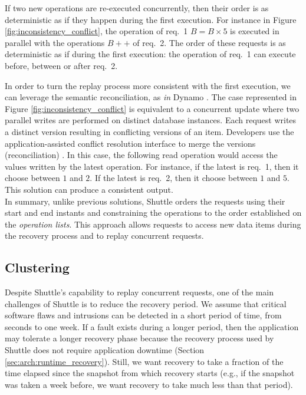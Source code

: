 If two new operations are re-executed concurrently, then their order is as deterministic as if they happen during the first execution. For instance in Figure \ref{fig:inconsistency_conflict}, the operation of {req.~1} $B = B \times 5$ is executed in parallel with the operations $B++$ of {req.~2}. The order of these requests is as deterministic as if during the first execution: the operation of {req.~1} can execute before, between or after {req.~2}.


In order to turn the replay process more consistent with the first execution, we can leverage the semantic reconciliation, as \textit{in} Dynamo \cite{Decandia2007}. The case represented in Figure \ref{fig:inconsistency_conflict} is equivalent to a concurrent update where two parallel writes are performed on distinct database instances. Each request writes a distinct version resulting in conflicting versions of an item. Developers use the application-assisted conflict resolution interface to merge the versions (reconciliation) \cite{Decandia2007}. In this case, the following read operation would access the values written by the latest operation. For instance, if the latest is {req.~1}, then it choose between $1$ and $2$. If the latest is {req.~2}, then it choose between $1$ and $5$. This solution can produce a consistent output.\\

In summary, unlike previous solutions, Shuttle orders the requests using their start and end instants and constraining the operations to the order established on the \textit{operation lists}. This approach allows requests to access new data items during the recovery process and to replay concurrent requests.





\subsection{Clustering}
\label{sec:arch:clustering}

Despite Shuttle's capability to replay concurrent requests, one of the main challenges of Shuttle is to reduce the recovery period. We assume that critical software flaws and intrusions can be detected in a short period of time, from seconds to one week. If a fault exists during a longer period, then the application may tolerate a longer recovery phase because the recovery process used by Shuttle does not require application downtime (Section \ref{sec:arch:runtime_recovery}). Still, we want recovery to take a fraction of the time elapsed since the snapshot from which recovery starts (e.g., if the snapshot was taken a week before, we want recovery to take much less than that period).  

